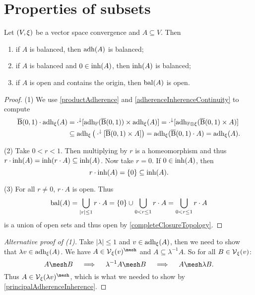 \section{Properties of subsets}
\begin{proposition} \label{inherenceAdherenceBalanced}
Let $\left( V,\xi \right)$ be a vector space convergence and $A\subseteq V$. Then
\begin{enumerate}
\item if $A$ is balanced, then $\operatorname{adh}(A)$ is balanced;
\item if $A$ is balanced and $0\in\operatorname{inh}(A)$, then $\operatorname{inh}(A)$ is balanced;
\item if $A$ is open and contains the origin, then $\operatorname{bal}(A)$ is open.
\end{enumerate}
\end{proposition}
\begin{proof}
(1) We use \ref{productAdherence} and \ref{adherenceInherenceContinuity} to compute
\begin{align*}
\operatorname{\overline{B}}(0,1)\cdot \operatorname{adh}_\xi(A) &= \cdot^\downarrow[\operatorname{adh}_{\mathbb{F}}(\operatorname{\overline{B}}(0,1))\times \operatorname{adh}_\xi(A)] = \cdot^\downarrow[\operatorname{adh}_{\mathbb{F}\otimes \xi}(\operatorname{\overline{B}}(0,1)\times A)] \\
&\subseteq \operatorname{adh}_{\xi}\big(\cdot^\downarrow[\operatorname{\overline{B}}(0,1)\times A]\big) = \operatorname{adh}_{\xi}(\operatorname{\overline{B}}(0,1)\cdot A) = \operatorname{adh}_\xi(A).
\end{align*}

(2) Take $0<r<1$. Then multiplying by $r$ is a homeomorphism and thus $r\cdot\operatorname{inh}(A) = \operatorname{inh}(r\cdot A) \subseteq \operatorname{inh}(A)$. Now take $r=0$. If $0\in\operatorname{inh}(A)$, then
\[ r\cdot\operatorname{inh}(A) = \{0\} \subseteq \operatorname{inh}(A). \]

(3) For all $r\neq 0$, $r\cdot A$ is open. Thus
\[ \operatorname{bal}(A) = \bigcup_{|r|\leq 1}r\cdot A = \{0\}\cup \bigcup_{0< r\leq 1}r\cdot A = \bigcup_{0< r\leq 1}r\cdot A \]
is a union of open sets and thus open by \ref{completeClosureTopology}.
\end{proof}
\begin{proof}[Alternative proof of (1)]
Take $|\lambda|\leq 1$ and $v\in \operatorname{adh}_\xi(A)$, then we need to show that $\lambda v \in \operatorname{adh}_\xi(A)$. We have $A\in \vicinity_\xi(v)^{\mesh}$ and $A\subseteq \lambda^{-1}A$. So for all $B\in \operatorname{\mathcal{V}}_\xi(v)$:
\[ A\mesh B \quad\implies\quad \lambda^{-1}A\mesh B \quad\implies\quad A\mesh \lambda B. \]
Thus $A\in \vicinity_\xi(\lambda v)^{\mesh}$, which is what we needed to show by \ref{principalAdherenceInherence}.
\end{proof}

